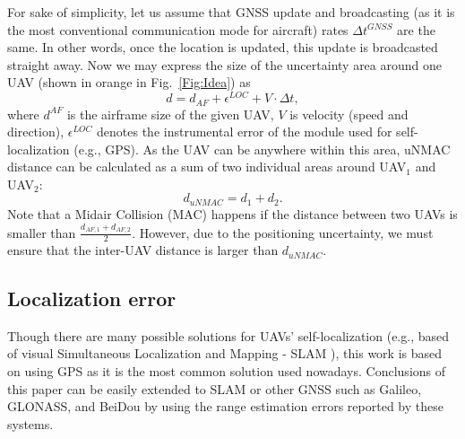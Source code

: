 \documentclass[conference]{IEEEtran}
\begin{document}
For sake of simplicity, let us assume that GNSS update and broadcasting (as it is the most conventional communication mode for aircraft) rates $\Delta t^{GNSS}$ are the same. In other words, once the location is updated, this update is broadcasted straight away. 
Now we may express the size of the uncertainty area around one UAV (shown in orange in Fig.~\ref{Fig:Idea}) as
\begin{equation}\label{eq:uNMAC}
    d = d_{AF} + \epsilon^{LOC} + V\cdot\Delta t,
\end{equation}
where $d^{AF}$ is the airframe size of the given UAV, $V$ is velocity (speed and direction),   $\epsilon^{LOC}$ denotes the instrumental error of the module used for self-localization (e.g., GPS). As the UAV can be anywhere within this area, uNMAC distance can be calculated as a sum of two individual areas around UAV$_1$ and UAV$_2$:
\begin{equation}
    d_{uNMAC} = d_{1} + d_{2}.
\end{equation}
Note that a Midair Collision (MAC) happens if the distance between two UAVs is smaller than $\frac{d_{AF,1}+d_{AF,2}}{2}$. However, due to the positioning uncertainty, we must ensure that the inter-UAV distance is larger than $d_{uNMAC}$.

\subsection{Localization error}
Though there are many possible solutions for UAVs' self-localization (e.g., based of visual Simultaneous Localization and Mapping - SLAM \cite{Vinogradov21}), this work is based on using GPS as it is the most common solution used nowadays. Conclusions of this paper can be easily extended to SLAM or other GNSS such as Galileo, GLONASS, and BeiDou by using the range estimation errors reported by these systems. 
\end{document}
